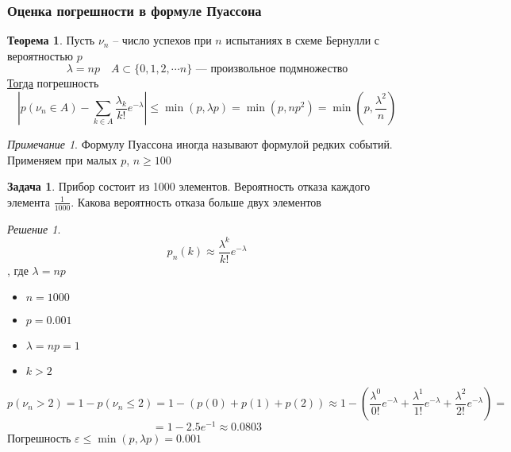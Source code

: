 \documentclass[english]{article}
\theoremstyle{plain}
\theoremstyle{remark}
\newtheorem*{remark}{Примечание}
\newtheorem*{solution}{Решение}
\theoremstyle{definition}
\newtheorem{task}{Задача}
\newtheorem{theorem}{Теорема}[section]
\begin{document}
\subsubsection{Оценка погрешности в формуле Пуассона}
\label{sec:org58c7d79}
\begin{theorem}
Пусть \(\nu_n\) -- число успехов при \(n\) испытаниях в схеме Бернулли с вероятностью \(p\)
\[ \lambda = np\quad A \subset \{0, 1, 2, \dotsm n\}\text{ --- произвольное подмножество}\]
\uline{Тогда} погрешность
\[ \left|p(\nu_n \in A) - \sum_{k \in A} \frac{\lambda_k}{k!} e^{-\lambda}\right| \le \min(p, \lambda p) = \min(p, np^2) = \min\left(p, \frac{\lambda^2}{n}\right) \]
\end{theorem}
\begin{remark}
Формулу Пуассона иногда называют формулой редких событий. Применяем при малых \(p\), \(n \ge 100\)
\end{remark}
\begin{task}
Прибор состоит из 1000 элементов. Вероятность отказа каждого элемента \(\frac{1}{1000}\). Какова вероятность отказа больше двух элементов
\end{task}
\begin{solution}
\[ p_n(k) \approx \frac{\lambda^k}{k!}e^{-\lambda} \]
, где \(\lambda = np\)
\begin{itemize}
\item \(n = 1000\)
\item \(p = 0.001\)
\item \(\lambda = np = 1\)
\item \(k > 2\)
\end{itemize}
\[ p(\nu_n > 2) = 1 - p(\nu_n \le 2) = 1 - (p(0) + p(1) + p(2)) \approx 1 - \left(\frac{\lambda^0}{0!} e^{-\lambda} + \frac{\lambda^1}{1!}e^{-\lambda} + \frac{\lambda^2}{2!}e^{-\lambda}\right) = \]
\[ = 1 - 2.5e^{-1} \approx 0.0803\]
Погрешность \(\varepsilon \le \min(p, \lambda p) = 0.001\)
\end{solution}
\end{document}
